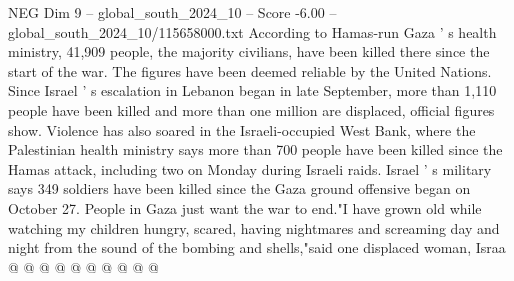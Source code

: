\begin{textsample}{NEG Dim 9 – global\_south\_2024\_10 – Score -6.00 – global\_south\_2024\_10/115658000.txt}
According to Hamas-run Gaza ' s health ministry, 41,909 people, the majority civilians, have been killed there since the start of the war.
The figures have been deemed reliable by the United Nations.
Since Israel ' s escalation in Lebanon began in late September, more than 1,110 people have been killed and more than one million are displaced, official figures show.
Violence has also soared in the Israeli-occupied West Bank, where the Palestinian health ministry says more than 700 people have been killed since the Hamas attack, including two on Monday during Israeli raids.
Israel ' s military says 349 soldiers have been killed since the Gaza ground offensive began on October 27.
People in Gaza just want the war to end."I have grown old while watching my children hungry, scared, having nightmares and screaming day and night from the sound of the bombing and shells,"said one displaced woman, Israa @ @ @ @ @ @ @ @ @ @

\end{textsample}
